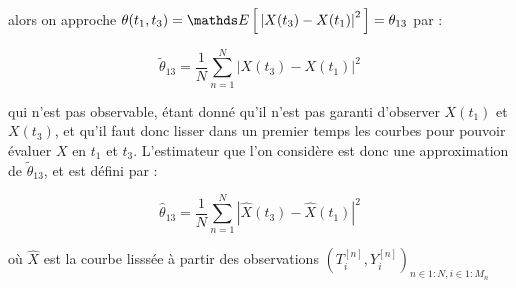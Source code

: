 alors on approche $\theta (t_1,t_3) = \esperance{ \left| X(t_3) - X(t_1) \right|^2 } = \theta_{13}$ par :

\begin{equation*}
	\tilde \theta_{13} = \frac 1 N \sum\limits_{n=1}^N \left| X(t_3) - X(t_1) \right|^2
\end{equation*}

qui n'est pas observable, étant donné qu'il n'est pas garanti d'observer $X(t_1)$ et $X(t_3)$, et qu'il faut donc lisser dans un premier temps les courbes pour pouvoir évaluer $X$ en $t_1$ et $t_3$. L'estimateur que l'on considère est donc une approximation de $\tilde \theta_{13}$, et est défini par :

\begin{equation*}
	\hat \theta_{13} = \frac 1 N \sum\limits_{n=1}^N \left| \hat X(t_3) - \hat X(t_1) \right|^2
\end{equation*}

où $\hat X$ est la courbe lisssée à partir des observations $( T_i^{[n]}, Y_i^{[n]} )_{n \in 1:N, i \in 1:M_n}$
